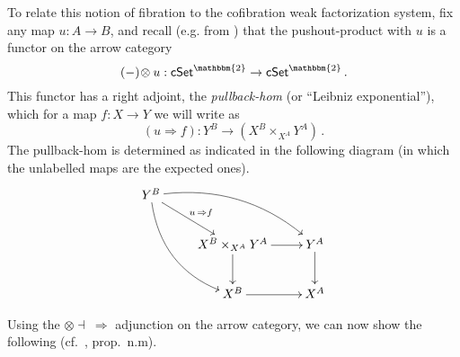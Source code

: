 \documentclass[12pt]{article}
\newcommand{\cSet}{\ensuremath{\mathsf{cSet}}}
\newcommand{\ra}{\ensuremath{\rightarrow}}
\theoremstyle{remark}
\theoremstyle{definition}
\begin{document}
To relate this notion of fibration to the cofibration weak factorization system, fix any map $u : A \ra B$, and recall (e.g. from \cite{R}) that the pushout-product with $u$ is a functor on the arrow category 
\[
(-)\!\otimes u : \cSet^\mathbbm{2} \ra\cSet^\mathbbm{2}\,.
\]
This functor has a right adjoint, the \emph{pullback-hom} (or ``Leibniz exponential''), which for a map $f : X\ra Y$ we will write as
\[
(u \Rightarrow\! f) : Y^B \ra (X^B \times_{X^A} Y^A) \,.
\]
The pullback-hom is determined as indicated in the following diagram (in which the unlabelled maps are the expected ones).
\begin{equation}\label{diagram:pullbackhom}
\xymatrix{
Y^B \ar@/_4ex/ [rdd] \ar[rd]^{u\, \Rightarrow f} \ar@/^4ex/ [rrd] && \\
& X^B \times_{X^A} Y^A \ar[d] \ar[r] & Y^A \ar[d] \\
& X^B \ar[r] &  X^A 
}
\end{equation}

Using the $\otimes\dashv\ \Rightarrow$ adjunction on the arrow category, we can now show the following (cf.~\cite{GG}, prop.~n.m).
\end{document}
